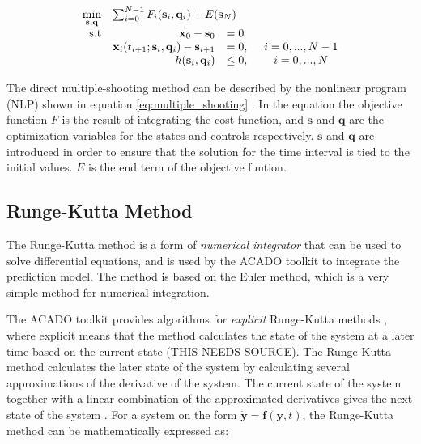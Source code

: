\begin{equation}
\label{eq:multiple_shooting}
	\begin{array}{rrlcl}
	\displaystyle \min_{\mathbf{s},\mathbf{q}} & \multicolumn{3}{l}{\sum_{i=0}^{N-1} F_i(\mathbf{s}_i, \mathbf{q}_i)+ E(\mathbf{s}_N)} \\
	\textrm{s.t}
	& \mathbf{x}_0 - \mathbf{s}_0 & = 0 & \\
	& \mathbf{x}_i(t_{i+1};\mathbf{s}_i,\mathbf{q}_i)-\mathbf{s}_{i+1} & = 0,& \hspace{5pt} i = 0,...,N-1 \\
	& h(\mathbf{s}_i, \mathbf{q}_i) & \leq 0,& \hspace{5pt} i = 0,...,N
	\end{array}
\end{equation}

The direct multiple-shooting method can be described by the nonlinear program (NLP) shown in equation \ref{eq:multiple_shooting} \cite{stallMATHISEN}. In the equation the objective function $F$ is the result of integrating the cost function, and $\mathbf{s}$ and $\mathbf{q}$ are the optimization variables for the states and controls respectively. $\mathbf{s}$ and $\mathbf{q}$ are introduced in order to ensure that the solution for the time interval is tied to the initial values. $E$ is the end term of the objective funtion.


\subsection{Runge-Kutta Method}

The Runge-Kutta method is a form of \textit{numerical integrator} that can be used to solve differential equations, and is used by the ACADO toolkit to integrate the prediction model. The method is based on the Euler method, which is a very simple method for numerical integration.

The ACADO toolkit provides algorithms for \textit{explicit} Runge-Kutta methods \cite{acadoHOUSKA}, where explicit means that the method calculates the state of the system at a later time based on the current state (THIS NEEDS SOURCE). The Runge-Kutta method calculates the later state of the system by calculating several approximations of the derivative of the system. The current state of the system together with a linear combination of the approximated derivatives gives the next state of the system \cite{modsimEGELAND}. For a system on the form $\mathbf{\dot{y}} = \mathbf{f}(\mathbf{y},t)$, the Runge-Kutta method can be mathematically expressed as:

